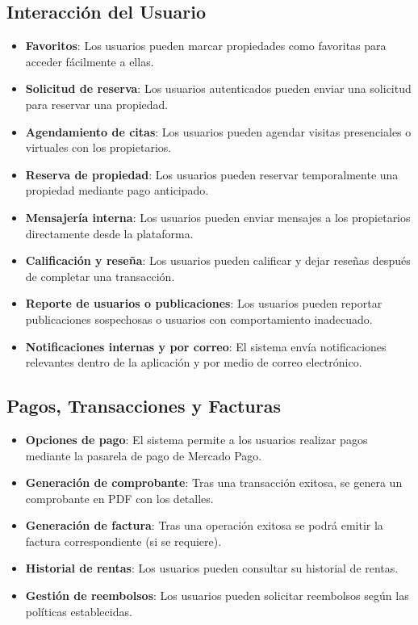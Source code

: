	\subsection{Interacción del Usuario}
		\begin{itemize}
			\item \textbf{Favoritos}: Los usuarios pueden marcar propiedades como favoritas para acceder fácilmente a ellas.
			\item \textbf{Solicitud de reserva}: Los usuarios autenticados pueden enviar una solicitud para reservar una propiedad.
			\item \textbf{Agendamiento de citas}: Los usuarios pueden agendar visitas presenciales o virtuales con los propietarios.
			\item \textbf{Reserva de propiedad}: Los usuarios pueden reservar temporalmente una propiedad mediante pago anticipado.
			\item \textbf{Mensajería interna}: Los usuarios pueden enviar mensajes a los propietarios directamente desde la plataforma.
			\item \textbf{Calificación y reseña}: Los usuarios pueden calificar y dejar reseñas después de completar una transacción.
			\item \textbf{Reporte de usuarios o publicaciones}: Los usuarios pueden reportar publicaciones sospechosas o usuarios con comportamiento inadecuado.
			\item \textbf{Notificaciones internas y por correo}: El sistema envía notificaciones relevantes dentro de la aplicación y por medio de correo electrónico.
		\end{itemize}
	
	\subsection{Pagos, Transacciones y Facturas}
		\begin{itemize}
			\item \textbf{Opciones de pago}: El sistema permite a los usuarios realizar pagos mediante la pasarela de pago de Mercado Pago.
			\item \textbf{Generación de comprobante}: Tras una transacción exitosa, se genera un comprobante en PDF con los detalles.
			\item \textbf{Generación de factura}: Tras una operación exitosa se podrá emitir la factura correspondiente (si se requiere).
			\item \textbf{Historial de rentas}: Los usuarios pueden consultar su historial de rentas.
			\item \textbf{Gestión de reembolsos}: Los usuarios pueden solicitar reembolsos según las políticas establecidas.
		\end{itemize}
	
